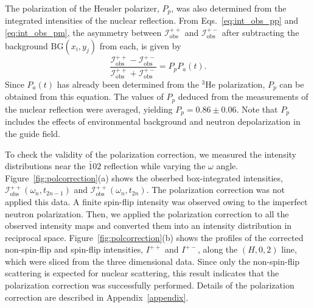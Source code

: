 \documentclass[%
 reprint,
superscriptaddress,
 amsmath,amssymb,
 aps,
floatfix,
]{revtex4-2}
\newcommand{\He}{$^3$He }
\begin{document}
The polarization of the Heusler polarizer, $P_p$, was also determined from the integrated intensities of the nuclear reflection.
From Eqs.~\ref{eq:int_obs_pp} and \ref{eq:int_obs_pm}, the asymmetry between $\mathcal{I}^{++}_\mathrm{obs}$ and $\mathcal{I}^{+-}_\mathrm{obs}$ after subtracting the background $\mathrm{BG}(x_i, y_j)$ from each, is given by
\begin{equation}
    \frac{\mathcal{I}^{++}_\mathrm{obs}-\mathcal{I}^{+-}_\mathrm{obs}}{\mathcal{I}^{++}_\mathrm{obs}+\mathcal{I}^{+-}_\mathrm{obs}} = P_pP_a(t).
\end{equation}
Since $P_a(t)$ has already been determined from the \He polarization, $P_p$ can be obtained from this equation.
The values of $P_p$ deduced from the measurements of the nuclear reflection were averaged, yielding $P_p = 0.86 \pm 0.06$.
Note that $P_p$ includes the effects of environmental background and neutron depolarization in the guide field.

To check the validity of the polarization correction, we measured the intensity distributions near the $\bar{1}02$ reflection while varying the $\omega$ angle.
Figure~\ref{fig:polcorrection}(a) shows the obserbed box-integrated intensities, $\mathcal{I}^{++}_\mathrm{obs}(\omega_n, t_{2n-1})$ and $\mathcal{I}^{++}_\mathrm{obs}(\omega_n, t_{2n})$.
The polarization correction was not applied this data.
A finite spin-flip intensity was observed owing to the imperfect neutron polarization. %
Then, we applied the polarization correction to all the observed intensity maps and converted them into an intensity distribution in reciprocal space.
Figure~\ref{fig:polcorrection}(b) shows the profiles of the corrected non-spin-flip and spin-flip intensities, ${I}^{++}$ and ${I}^{+-}$, along the $(H,0,2)$ line, which were sliced from the three dimensional data.
Since only the non-spin-flip scattering is expected for nuclear scattering, this result indicates that the polarization correction was successfully performed.
Details of the polarization correction are described in Appendix~\ref{appendix}.

\end{document}
